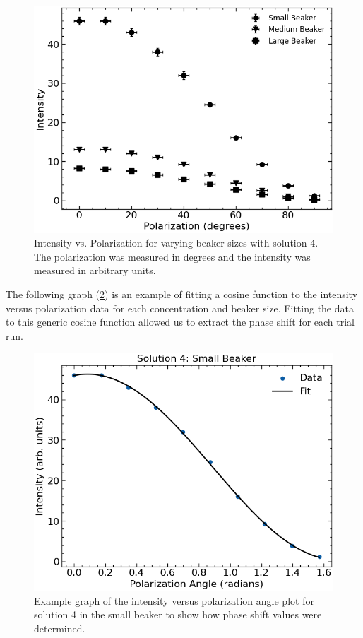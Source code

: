 \begin{figure}[H]
    \begin{center}
        \includegraphics[width=\columnwidth]{../figures/solution4.png}
    \end{center}
    \caption{Intensity vs. Polarization for varying beaker sizes with solution 4. The polarization was measured in degrees and the intensity was measured in arbitrary units.}
    \label{solution4_figure}
\end{figure}

The following graph (\cref{solution4_small_beaker_fit_figure}) is an example of fitting a cosine function to the intensity versus polarization data for each concentration and beaker size. Fitting the data to this generic cosine function allowed us to extract the phase shift for each trial run.

\begin{figure}[H]
	\begin{center}
		\includegraphics[width=\columnwidth]{../figures/solution4_small_beaker_fit.png}
	\end{center}
	\caption{Example graph of the intensity versus polarization angle plot for solution 4 in the small beaker to show how phase shift values were determined.}
	\label{solution4_small_beaker_fit_figure}
\end{figure}

